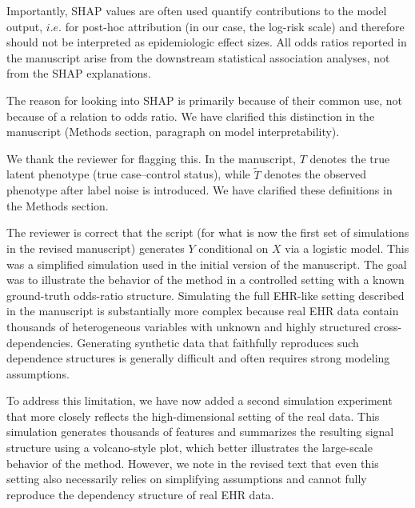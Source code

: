 \documentclass[onecolumn,11pt]{IEEEtran}
\begin{document}
Importantly, SHAP values are often used quantify contributions to the model output, $i.e.$ for post-hoc attribution (in our case, the log-risk scale) and therefore should not be interpreted as epidemiologic effect sizes. All odds ratios reported in the manuscript arise from the downstream statistical association analyses, not from the SHAP explanations.

The reason for looking into SHAP is primarily because of their common use, not because of a relation to odds ratio.
We have clarified this distinction in the manuscript (Methods section, paragraph on model interpretability).



We thank the reviewer for flagging this. In the manuscript, $T$ denotes the true latent phenotype (true case--control status), while $\tilde{T}$ denotes the observed phenotype after label noise is introduced. We have clarified these definitions in the Methods section.



The reviewer is correct that the  script (for what is now the first set of simulations in the revised manuscript) generates $Y$ conditional on $X$ via a logistic model. This was a simplified simulation used in the initial version of the manuscript. The goal was to illustrate the behavior of the method in a controlled setting with a known ground-truth odds-ratio structure. Simulating the full EHR-like setting described in the manuscript is substantially more complex because real EHR data contain thousands of heterogeneous variables with unknown and highly structured cross-dependencies. Generating synthetic data that faithfully reproduces such dependence structures is generally difficult and often requires strong modeling assumptions.

To address this limitation, we have now added a second simulation experiment that more closely reflects the high-dimensional setting of the real data. This simulation generates thousands of features and summarizes the resulting signal structure using a volcano-style plot, which better illustrates the large-scale behavior of the method. However, we note in the revised text that even this setting also necessarily relies on simplifying assumptions and cannot fully reproduce the dependency structure of real EHR data.
\end{document}
